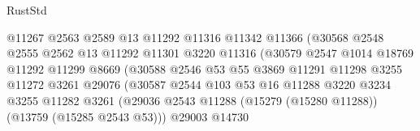 \begin{lexlean}{RustStd}
\begin{coremodule}
                                      @11267
                                      @2563
                                      @2589
                                      @13
                                      @11292
                                      @11316
                                      @11342
                                      @11366
                                      (@30568
                                        @2548
                                        @2555
                                        @2562
                                        @13
                                        @11292
                                        @11301
                                        @3220
                                        @11316
                                        (@30579
                                          @2547
                                          @1014
                                          @18769
                                          @11292
                                          @11299
                                          @8669
                                          (@30588
                                            @2546
                                            @53
                                            @55
                                            @3869
                                            @11291
                                            @11298
                                            @3255
                                            @11272
                                            @3261
                                            @29076
                                            (@30587
                                              @2544
                                              @103
                                              @53
                                              @16
                                              @11288
                                              @3220
                                              @3234
                                              @3255
                                              @11282
                                              @3261
                                              (@29036
                                                @2543
                                                @11288
                                                (@15279 (@15280 @11288))
                                                (@13759 (@15285 @2543 @53)))
                                              @29003
                                              @14730

\end{coremodule}
\end{lexlean}
